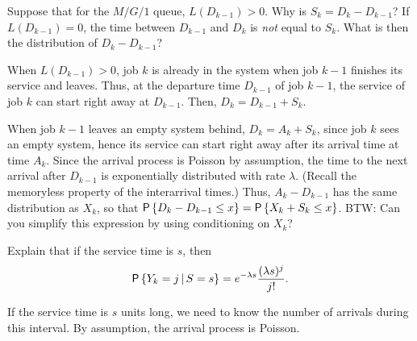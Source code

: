 \begin{question}
  Suppose that for the $M/G/1$ queue, $L(D_{k-1})>0$. Why is
  $S_k = D_k - D_{k-1}$?  If $L(D_{k-1}) = 0$, the time between
  $D_{k-1}$ and $D_k$ is \emph{not} equal to $S_k$. What is then the
  distribution of $D_k-D_{k-1}$?
  \begin{hint}
    
  \end{hint}

\begin{solution}
  When $L(D_{k-1})>0$, job $k$ is already in the system when job $k-1$
  finishes its service and leaves. Thus, at the departure time
  $D_{k-1}$ of job $k-1$, the service of job $k$ can start right away
  at $D_{k-1}$. Then, $D_k=D_{k-1}+S_k$.


    When job $k-1$ leaves an empty system behind, $D_k= A_k + S_k$,
    since job $k$ sees an empty system, hence its service can start
    right away after its arrival time at time $A_k$. Since the arrival
    process is Poisson by assumption, the time to the next arrival
    after $D_{k-1}$ is exponentially distributed with rate
    $\lambda$. (Recall the memoryless property of the interarrival
    times.) Thus, $A_k - D_{k-1}$ has the same distribution as $X_k$,
    so that $\P{D_k - D_{k-1} \leq x} = \P{X_k + S_k\leq x}$. BTW: Can
    you simplify this expression by using conditioning on $X_k$?
\end{solution}
\end{question}

\begin{question}
 Explain that if the service time is $s$, then
\begin{equation}\label{eq:4}
  \P{Y_k = j\given S=s} = e^{-\lambda s}\frac{(\lambda s)^j}{j!}.
\end{equation}
\begin{hint}
  
\end{hint}
  \begin{solution}
If the service time is $s$ units long, we need to know the number of arrivals during this interval. By assumption, the arrival process is Poisson. 
  \end{solution}
\end{question}

